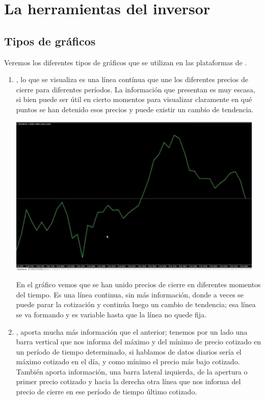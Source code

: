 \chapter{La herramientas del inversor}

\section{Tipos de gráficos}


Veremos los diferentes tipos de gráficos que se utilizan en las plataformas de . 

\begin{enumerate}
    \item {}, lo que se visualiza es una línea contínua que une los diferentes precios de cierre para diferentes períodos. La información que presentan es muy escasa, si bien puede ser útil en cierto momentos para visualizar claramente  en qué puntos se han detenido esos precios y puede existir un cambio de tendencia.
    \begin{center}
        \includegraphics[scale=.95]{images/graphs-01.png}
    \end{center}
    En el gráfico vemos que se han unido precios de cierre en diferentes momentos del tiempo. Es una línea continua, sin más información, donde a veces se puede parar la cotización y continúa luego un cambio de tendencia; esa línea se va formando y es variable hasta que la línea no quede fija.
    \item {}, aporta mucha más información que el anterior; tenemos por un lado una barra vertical que nos informa del máximo y del mínimo de precio cotizado en un período de tiempo determinado, si hablamos de datos diarios sería el máximo cotizado en el día, y como mínimo el precio más bajo cotizado. También aporta información, una barra lateral izquierda, de la apertura o primer precio cotizado y hacia la derecha otra línea que nos informa del precio de cierre en ese período de tiempo último cotizado.

\end{enumerate}

